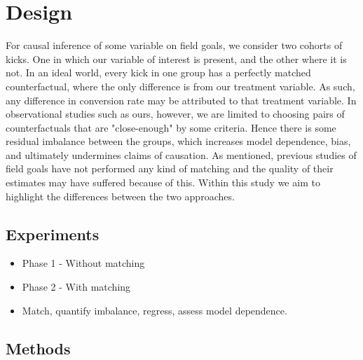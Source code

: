 \chapter{Design}





For causal inference of some variable on field goals, we consider two cohorts of kicks. One in which our variable of interest is present, and the other where it is not. In an ideal world, every kick in one group has a perfectly matched counterfactual, where the only difference is from our treatment variable. As such, any difference in conversion rate may be attributed to that treatment variable. In observational studies such as ours, however, we are limited to choosing pairs of counterfactuals that are "close-enough" by some criteria. Hence there is some residual imbalance between the groups, which increases model dependence, bias, and ultimately undermines claims of causation. As mentioned, previous studies of field goals have not performed any kind of matching and the quality of their estimates may have suffered because of this. Within this study we aim to highlight the differences between the two approaches.

\section{Experiments}
\begin{itemize}
    \item Phase 1 - Without matching
    \item Phase 2 - With matching
    \item Match, quantify imbalance, regress, assess model dependence.
\end{itemize}

\section{Methods}
